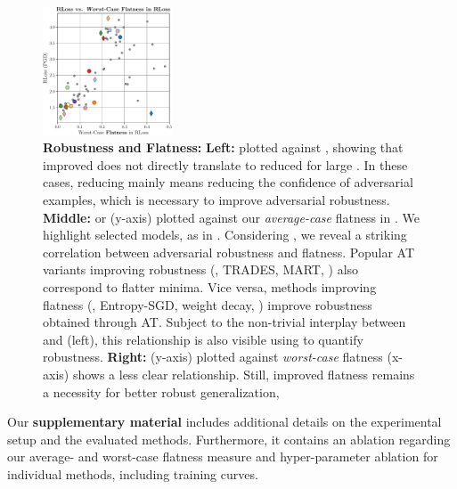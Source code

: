 \begin{figure}[t]
\begin{minipage}[t]{0.01\textwidth}
		\hspace*{4px}{\color{black!75}\rule{0.65px}{3.8cm}}
	\end{minipage}
	\hspace*{2px}
	\begin{minipage}[t]{0.2\textwidth}
		\vspace*{0px}
		
		\includegraphics[height=3.8cm]{plots_main_flatness_correlation_joint_loss}
	\end{minipage}
	
	\vspace*{-6px}
	\caption{\textbf{Robustness and Flatness:} \textbf{Left:} \RTE plotted against \RCE, showing that improved \RCE does not directly translate to reduced \RTE for large \RCE. In these cases, reducing \RCE mainly means reducing the confidence of adversarial examples, which is necessary to improve adversarial robustness. \textbf{Middle:} \RCE or \RTE (y-axis) plotted against our \emph{average-case} flatness in \RCE. We highlight selected models, as in . Considering \RCE, we reveal a striking correlation between adversarial robustness and flatness. Popular AT variants improving robustness (\eg, {\color{plot11}TRADES}, {\color{plot0}MART}, \etc) also correspond to flatter minima. Vice versa, methods improving flatness (\eg, {\color{plot10}Entropy-SGD}, {\color{plot7}weight decay}, \etc) improve robustness obtained through AT. Subject to the non-trivial interplay between \RTE and \RCE (\cf left), this relationship is also visible using \RTE to quantify robustness. \textbf{Right:} \RCE (y-axis) plotted against \emph{worst-case} flatness (x-axis) shows a less clear relationship. Still, improved flatness remains a necessity for better robust generalization, }
	\label{fig:experiments-flatness-correlation}
	\vspace*{-6px}
\end{figure}

Our \textbf{supplementary material} includes additional details on the experimental setup and the evaluated methods. Furthermore, it contains an ablation regarding our average- and worst-case flatness measure and hyper-parameter ablation for individual methods, including training curves.
 
